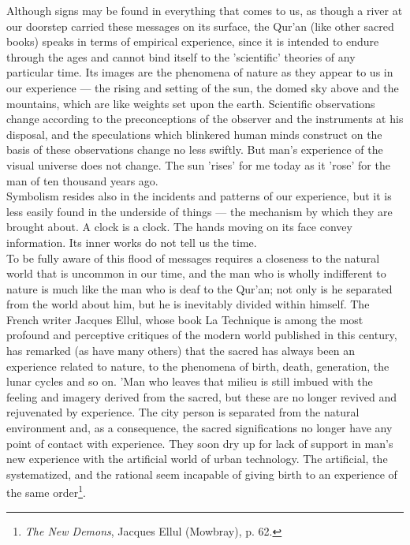 \documentclass[11pt, b5paper, twoside]{book}
\begin{document}
Although signs may be found in everything that comes to us, as though a river at our doorstep carried 
these messages on its surface, the Qur'an (like other sacred books) speaks in terms of empirical 
experience, since it is intended to endure through the ages and cannot bind itself to the 
'scientific' theories of any particular time. Its images are the phenomena of nature as they appear 
to us in our experience --- the rising and setting of the sun, the domed sky above and the mountains, 
which are like weights set upon the earth. Scientific observations change according to the 
preconceptions of the observer and the instruments at his disposal, and the speculations which 
blinkered human minds construct on the basis of these observations change no less swiftly. But man's 
experience of the visual universe does not change. The sun 'rises' for me today as it 'rose' for the 
man of ten thousand years ago. \\

Symbolism resides also in the incidents and patterns of our experience, but it is less easily found 
in the underside of things --- the mechanism by which they are brought about. A clock is a clock. The 
hands moving on its face convey information. Its inner works do not tell us the time. \\

To be fully aware of this flood of messages requires a closeness to the natural world that is 
uncommon in our time, and the man who is wholly indifferent to nature is much like the man who is 
deaf to the Qur'an; not only is he separated from the world about him, but he is inevitably divided 
within himself. The French writer Jacques Ellul, whose book La Technique is among the most profound 
and perceptive critiques of the modern world published in this century, has remarked (as have many 
others) that the sacred has always been an experience related to nature, to the phenomena of birth, 
death, generation, the lunar cycles and so on. 'Man who leaves that milieu is still imbued with the 
feeling and imagery derived from the sacred, but these are no longer revived and rejuvenated by 
experience. The city person is separated from the natural environment and, as a consequence, the 
sacred significations no longer have any point of contact with experience. They soon dry up for lack 
of support in man's new experience with the artificial world of urban technology. The artificial, the 
systematized, and the rational seem incapable of giving birth to an experience of the same 
order\footnote{\emph{The New Demons}, Jacques Ellul (Mowbray), p. 62.}.
\end{document}
